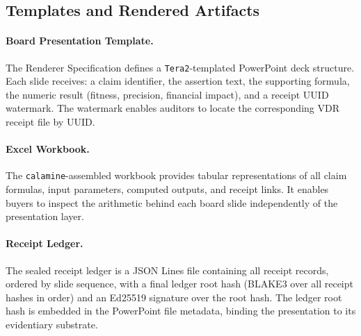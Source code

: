 \subsection{Templates and Rendered Artifacts}
\label{sec:ma-impl-templates}

\paragraph{Board Presentation Template.}
The Renderer Specification defines a \texttt{Tera2}-templated PowerPoint deck structure. Each
slide receives: a claim identifier, the assertion text, the supporting formula, the numeric
result (fitness, precision, financial impact), and a receipt UUID watermark. The watermark
enables auditors to locate the corresponding VDR receipt file by UUID.

\paragraph{Excel Workbook.}
The \texttt{calamine}-assembled workbook provides tabular representations of all claim
formulas, input parameters, computed outputs, and receipt links. It enables buyers to inspect
the arithmetic behind each board slide independently of the presentation layer.

\paragraph{Receipt Ledger.}
The sealed receipt ledger is a JSON Lines file containing all receipt records, ordered by
slide sequence, with a final ledger root hash (BLAKE3 over all receipt hashes in order) and
an Ed25519 signature over the root hash. The ledger root hash is embedded in the PowerPoint
file metadata, binding the presentation to its evidentiary substrate.
